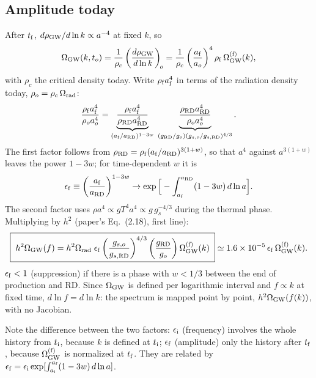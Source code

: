 \documentclass[11pt,a4paper]{article}
\begin{document}
\subsection{Amplitude today}
After $t_{\rm f}$, $d\rho_{\rm GW}/d\ln k\propto a^{-4}$ at fixed $k$, so
\begin{equation}
\Omega_{\rm GW}(k,t_o)=\frac{1}{\rho_c}\left(\frac{d\rho_{\rm GW}}{d\ln k}\right)_{\!o}
=\frac{1}{\rho_c}\left(\frac{a_{\rm f}}{a_o}\right)^{4}\rho_{\rm f}\,\Omega_{\rm GW}^{(\rm f)}(k),
\end{equation}
with $\rho_c$ the critical density today. Write $\rho_{\rm f}a_{\rm f}^4$ in terms of the radiation density today, $\rho_o=\rho_c\,\Omega_{\rm rad}$:
\begin{equation}
\frac{\rho_{\rm f}a_{\rm f}^4}{\rho_o a_o^4}
=\underbrace{\frac{\rho_{\rm f}a_{\rm f}^4}{\rho_{\rm RD}a_{\rm RD}^4}}_{(a_{\rm f}/a_{\rm RD})^{1-3w}}\;
\underbrace{\frac{\rho_{\rm RD}a_{\rm RD}^4}{\rho_o a_o^4}}_{(g_{\rm RD}/g_o)(g_{s,o}/g_{s,\rm RD})^{4/3}} .
\end{equation}
The first factor follows from $\rho_{\rm RD}=\rho_{\rm f}(a_{\rm f}/a_{\rm RD})^{3(1+w)}$, so that $a^4$ against $a^{3(1+w)}$ leaves the power $1-3w$; for time-dependent $w$ it is
\begin{equation}
\epsilon_{\rm f}\equiv\left(\frac{a_{\rm f}}{a_{\rm RD}}\right)^{1-3w}\to\exp\Big[-\int_{a_{\rm f}}^{a_{\rm RD}}(1-3w)\,d\ln a\Big]. \label{eq:epsf}
\end{equation}
The second factor uses $\rho a^4\propto gT^4a^4\propto g\,g_s^{-4/3}$ during the thermal phase. Multiplying by $h^2$ (paper's Eq.~(2.18), first line):
\begin{equation}
\boxed{\;h^2\Omega_{\rm GW}(f)=h^2\Omega_{\rm rad}\;\epsilon_{\rm f}\left(\frac{g_{s,o}}{g_{s,\rm RD}}\right)^{4/3}\left(\frac{g_{\rm RD}}{g_o}\right)\Omega_{\rm GW}^{(\rm f)}(k)\;}
\simeq1.6\times10^{-5}\,\epsilon_{\rm f}\,\Omega_{\rm GW}^{(\rm f)}(k). \label{eq:Otoday}
\end{equation}
$\epsilon_{\rm f}<1$ (suppression) if there is a phase with $w<1/3$ between the end of production and RD. Since $\Omega_{\rm GW}$ is defined per logarithmic interval and $f\propto k$ at fixed time, $d\ln f=d\ln k$: the spectrum is mapped point by point, $h^2\Omega_{\rm GW}(f(k))$, with no Jacobian.

Note the difference between the two factors: $\epsilon_{\rm i}$ (frequency) involves the whole history from $t_{\rm i}$, because $k$ is defined at $t_{\rm i}$; $\epsilon_{\rm f}$ (amplitude) only the history after $t_{\rm f}$, because $\Omega_{\rm GW}^{(\rm f)}$ is normalized at $t_{\rm f}$. They are related by $\epsilon_{\rm f}=\epsilon_{\rm i}\exp[\int_{a_{\rm i}}^{a_{\rm f}}(1-3w)\,d\ln a]$.
\end{document}
